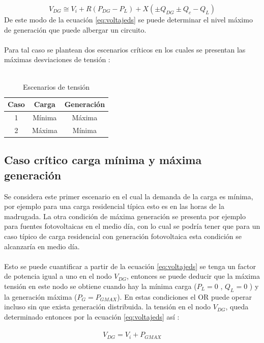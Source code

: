 \documentclass[12pt, letterpaper]{report}
\begin{document}
\begin{equation}
V_{DG} \cong V_{i} + R (P_{DG} - P_{L}) + X(\pm Q_{DG} \pm Q_{c} - Q_{L})
\label{eq:voltajeds}
\end{equation}
De este modo  de la ecuación \ref{eq:voltajeds} se puede determinar  el nivel máximo de generación que puede  albergar un circuito.\\\\
Para tal caso se plantean dos escenarios críticos en los cuales se presentan las máximas desviaciones de tensión \cite{Elkhatib2011a}:\\\\

\begin{table}[h]
	\centering
	\caption{Escenarios de tensión }
	\label{tab:escenarios_v}
	\vspace{0.5 cm}
\begin{tabular}{|c|c|c|}
    \hline 
    Caso 	& Carga 	& Generación \\\hline
    1 		& Mínima	& Máxima \\\hline
    2		& Máxima	& Mínima \\
    \hline
\end{tabular}
\end{table}

\subsection{Caso crítico carga mínima  y máxima generación }
Se considera este primer escenario en el cual la demanda de la carga es mínima, por ejemplo  para una carga residencial típica  esto es  en las horas de la madrugada. La otra condición de máxima generación se presenta por ejemplo para fuentes fotovoltaicas  en el medio día,  con lo cual se podría tener que para un caso típico de carga residencial con generación fotovoltaica esta condición se alcanzaría en medio día.\\\\
Esto se puede  cuantificar a partir de la ecuación \ref{eq:voltajeds} se tenga un factor de potencia igual a uno  en el nodo  $V_{DG}$, entonces se puede deducir que la máxima tensión en este nodo se obtiene cuando hay la mínima carga ($P_{L} = 0$ , $Q_{L} = 0$ )  y la generación máxima ($P_{G} = P_{GMAX}$). En estas condiciones el OR puede operar incluso sin que exista generación distribuida. la tensión en el nodo $V_{DG}$, queda determinado entonces por la ecuación \ref{eq:voltajeds} así \cite{strbac2002integration} :\\\\
\begin{equation}
V_{DG} = V_{i} + P_{GMAX}
\label{eq:vgmax}
\end{equation}
\end{document}
